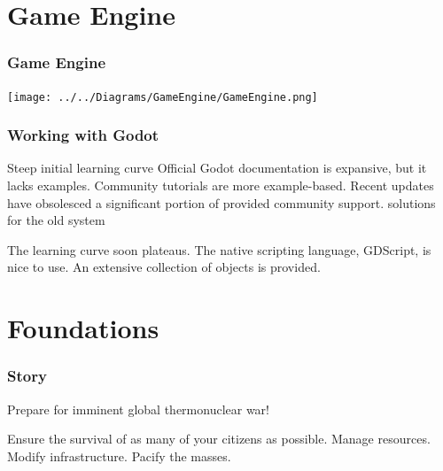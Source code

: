 \documentclass[ascpectratio=169]{beamer}
\begin{document}

\section{Game Engine}


\begin{frame}

  \frametitle{Game Engine}

  \begin{center}
    \texttt{[image: ../../Diagrams/GameEngine/GameEngine.png]}
  \end{center}

\end{frame}



\begin{frame}

  \frametitle{Working with Godot}

  \begin{outline}
    \1 Steep initial learning curve
    \1 Official Godot documentation is expansive, but it lacks examples.
    \1 Community tutorials are more example-based.
    \1 Recent updates have obsolesced a significant portion of provided
    community support.
      \2 solutions for the old system
  \end{outline}

  \vspace*{1cm}

  \begin{outline}
    \1 The learning curve soon plateaus.
    \1 The native scripting language, GDScript, is nice to use.
    \1 An extensive collection of objects is provided.
  \end{outline}

\end{frame}



\section{Foundations}


\begin{frame}

  \frametitle{Story}

  \begin{center}
    {\Large Prepare for imminent global thermonuclear war!}
  \end{center}

  \begin{outline}
    \1 Ensure the survival of as many of your citizens as possible.
    \1 Manage resources.
    \1 Modify infrastructure.
    \1 Pacify the masses.
  \end{outline}

\end{frame}
\end{document}
